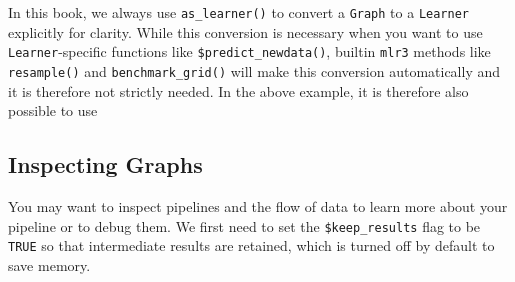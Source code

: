 \begin{tcolorbox}[enhanced jigsaw, opacitybacktitle=0.6, rightrule=.15mm, opacityback=0, arc=.35mm, breakable, titlerule=0mm, colframe=quarto-callout-tip-color-frame, coltitle=black, bottomrule=.15mm, toprule=.15mm, colback=white, colbacktitle=quarto-callout-tip-color!10!white, bottomtitle=1mm, toptitle=1mm, title=\textcolor{quarto-callout-tip-color}{\faLightbulb}\hspace{0.5em}{Automatic Conversion to Learner}, leftrule=.75mm, left=2mm]

In this book, we always use \texttt{as\_learner()} to convert a
\texttt{Graph} to a \texttt{Learner} explicitly for clarity. While this
conversion is necessary when you want to use \texttt{Learner}-specific
functions like \texttt{\$predict\_newdata()}, builtin \texttt{mlr3}
methods like \texttt{resample()} and \texttt{benchmark\_grid()} will
make this conversion automatically and it is therefore not strictly
needed. In the above example, it is therefore also possible to use

\begin{Shaded}
\begin{Highlighting}[]
\OtherTok{=} \NormalTok{(}\NormalTok{(}\NormalTok{),}
  \NormalTok{(}\NormalTok{) }\SpecialCharTok{\%\textgreater{}\textgreater{}\%}
  \NormalTok{(}\NormalTok{, } \NormalTok{))}
\end{Highlighting}
\end{Shaded}

\end{tcolorbox}

\hypertarget{inspecting-graphs}{%
\subsection{Inspecting Graphs}\label{inspecting-graphs}}

You may want to inspect pipelines and the flow of data to learn more
about your pipeline or to debug them. We first need to
set the \texttt{\$keep\_results} flag to be \texttt{TRUE} so that
intermediate results are retained, which is turned off by default to
save memory.

\begin{Shaded}
\begin{Highlighting}[]
\SpecialCharTok{$}\SpecialCharTok{$}\OtherTok{=} 
\SpecialCharTok{$}\NormalTok{(}\NormalTok{(}\NormalTok{))}
\end{Highlighting}
\end{Shaded}

